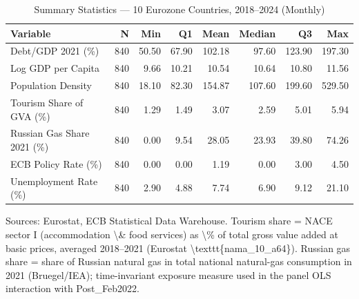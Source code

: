 \begin{table}[!h]
\centering
\caption{Summary Statistics --- 10 Eurozone Countries, 2018--2024 (Monthly) \label{tab:sumstats}}
\centering
\begin{threeparttable}
\begin{tabular}[t]{lrrrrrrr}
\toprule
Variable & N & Min & Q1 & Mean & Median & Q3 & Max\\
\midrule
Debt/GDP 2021 (\%) & 840 & 50.50 & 67.90 & 102.18 & 97.60 & 123.90 & 197.30\\
Log GDP per Capita & 840 & 9.66 & 10.21 & 10.54 & 10.64 & 10.80 & 11.56\\
Population Density & 840 & 18.10 & 82.30 & 154.87 & 107.60 & 199.60 & 529.50\\
Tourism Share of GVA (\%) & 840 & 1.29 & 1.49 & 3.07 & 2.59 & 5.01 & 5.94\\
Russian Gas Share 2021 (\%) & 840 & 0.00 & 9.54 & 28.05 & 23.93 & 39.80 & 74.26\\
\addlinespace
ECB Policy Rate (\%) & 840 & 0.00 & 0.00 & 1.19 & 0.00 & 3.00 & 4.50\\
Unemployment Rate (\%) & 840 & 2.90 & 4.88 & 7.74 & 6.90 & 9.12 & 21.10\\
\bottomrule
\end{tabular}
\begin{tablenotes}
\item Sources: Eurostat, ECB Statistical Data Warehouse. Tourism share = NACE sector I (accommodation \textbackslash{}\& food services) as \textbackslash{}\% of total gross value added at basic prices, averaged 2018--2021 (Eurostat \textbackslash{}texttt\{nama_10_a64\}). Russian gas share = share of Russian natural gas in total national natural-gas consumption in 2021 (Bruegel/IEA); time-invariant exposure measure used in the panel OLS interaction with Post_Feb2022.
\end{tablenotes}
\end{threeparttable}
\end{table}
